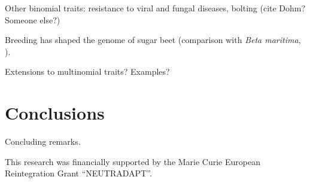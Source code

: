 Other binomial traits: resistance to viral and fungal diseases, bolting
(cite Dohm? Someone else?)

Breeding has shaped the genome of sugar beet (comparison with \emph{Beta
  maritima}, \cite{dohm2013genome}).

Extensions to multinomial traits? Examples?

%

\section{Conclusions}
\label{sec:conclusions}

Concluding remarks. 


\begin{acknowledgements}
This research was financially supported by the Marie Curie European
Reintegration Grant ``NEUTRADAPT''.
\end{acknowledgements}


